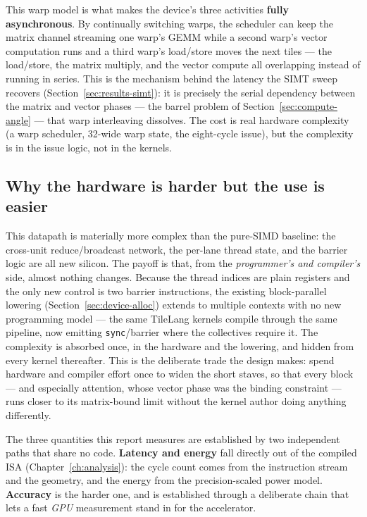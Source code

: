 \documentclass[11pt]{report}
\begin{document}
This warp model is what makes the device's three activities \textbf{fully
asynchronous}. By continually switching warps, the scheduler can keep the
matrix channel streaming one warp's GEMM while a second warp's vector
computation runs and a third warp's load/store moves the next tiles --- the
load/store, the matrix multiply, and the vector compute all overlapping
instead of running in series. This is the mechanism behind the latency the
SIMT sweep recovers (Section~\ref{sec:results-simt}): it is precisely the
serial dependency between the matrix and vector phases --- the barrel problem
of Section~\ref{sec:compute-angle} --- that warp interleaving dissolves. The
cost is real hardware complexity (a warp scheduler, 32-wide warp state, the
eight-cycle issue), but the complexity is in the issue logic, not in the
kernels.

\subsection{Why the hardware is harder but the use is easier}

This datapath is materially more complex than the pure-SIMD baseline: the
cross-unit reduce/broadcast network, the per-lane thread state, and the
barrier logic are all new silicon. The payoff is that, from the
\emph{programmer's and compiler's} side, almost nothing changes. Because the
thread indices are plain registers and the only new control is two barrier
instructions, the existing block-parallel lowering
(Section~\ref{sec:device-alloc}) extends to multiple contexts with no new
programming model --- the same TileLang kernels compile through the same
pipeline, now emitting \texttt{sync}/barrier where the collectives require it.
The complexity is absorbed once, in the hardware and the lowering, and hidden
from every kernel thereafter. This is the deliberate trade the design makes:
spend hardware and compiler effort once to widen the short staves, so that
every block --- and especially attention, whose vector phase was the binding
constraint --- runs closer to its matrix-bound limit without the kernel author
doing anything differently.

The three quantities this report measures are established by two
independent paths that share no code. \textbf{Latency and energy} fall
directly out of the compiled ISA (Chapter~\ref{ch:analysis}): the cycle
count comes from the instruction stream and the geometry, and the energy
from the precision-scaled power model. \textbf{Accuracy} is the harder one,
and is established through a deliberate chain that lets a fast \emph{GPU}
measurement stand in for the accelerator.
\end{document}
